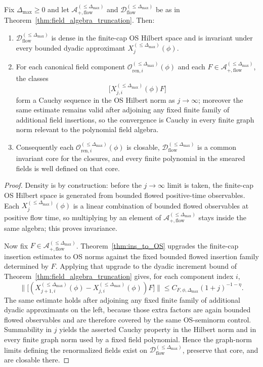 \begin{lemma}\label{lem:finite_cap_common_core}
Fix $\Delta_{\max}\ge 0$ and let $\mathcal A^{(\le \Delta_{\max})}_{+,\mathrm{flow}}$ and
$\mathcal D^{(\le \Delta_{\max})}_{\mathrm{flow}}$ be as in Theorem~\ref{thm:field_algebra_truncation}.
Then:
\begin{enumerate}[label=(\roman*),leftmargin=2.3em]
\item $\mathcal D^{(\le \Delta_{\max})}_{\mathrm{flow}}$ is dense in the finite-cap OS Hilbert space and is invariant under every bounded dyadic approximant $X^{(\le \Delta_{\max})}_j(\phi)$.
\item For each canonical field component $\mathcal O^{(\le \Delta_{\max})}_{\mathrm{ren},i}(\phi)$ and each $F\in \mathcal A^{(\le \Delta_{\max})}_{+,\mathrm{flow}}$, the classes
\[
\bigl[ X^{(\le \Delta_{\max})}_{j,i}(\phi)F \bigr]
\]
form a Cauchy sequence in the OS Hilbert norm as $j\to\infty$; moreover the same estimate remains valid after adjoining any fixed finite family of additional field insertions, so the convergence is Cauchy in every finite graph norm relevant to the polynomial field algebra.
\item Consequently each $\mathcal O^{(\le \Delta_{\max})}_{\mathrm{ren},i}(\phi)$ is closable, $\mathcal D^{(\le \Delta_{\max})}_{\mathrm{flow}}$ is a common invariant core for the closures, and every finite polynomial in the smeared fields is well defined on that core.
\end{enumerate}
\end{lemma}

\begin{proof}
Density is by construction: before the $j\to\infty$ limit is taken, the finite-cap OS Hilbert space is generated from bounded flowed positive-time observables.
Each $X^{(\le \Delta_{\max})}_j(\phi)$ is a linear combination of bounded flowed observables at positive flow time, so multiplying by an element of $\mathcal A^{(\le \Delta_{\max})}_{+,\mathrm{flow}}$ stays inside the same algebra; this proves invariance.

Now fix $F\in \mathcal A^{(\le \Delta_{\max})}_{+,\mathrm{flow}}$.
Theorem~\ref{thm:ins_to_OS} upgrades the finite-cap insertion estimates to OS norms against the fixed bounded flowed insertion family determined by $F$.
Applying that upgrade to the dyadic increment bound of Theorem~\ref{thm:field_algebra_truncation} gives, for each component index $i$,
\[
\bigl\|\bigl[(X^{(\le \Delta_{\max})}_{j+1,i}(\phi)-X^{(\le \Delta_{\max})}_{j,i}(\phi))F\bigr]\bigr\|
\le C_{F,\phi,\Delta_{\max}}(1+j)^{-1-\eta}.
\]
The same estimate holds after adjoining any fixed finite family of additional dyadic approximants on the left, because those extra factors are again bounded flowed observables and are therefore covered by the same OS-seminorm control.
Summability in $j$ yields the asserted Cauchy property in the Hilbert norm and in every finite graph norm used by a fixed field polynomial.
Hence the graph-norm limits defining the renormalized fields exist on $\mathcal D^{(\le \Delta_{\max})}_{\mathrm{flow}}$, preserve that core, and are closable there.
\end{proof}

